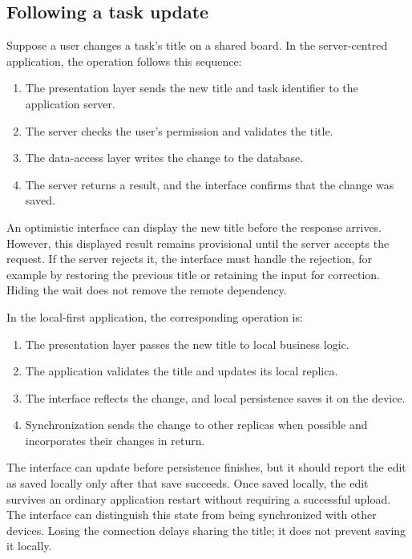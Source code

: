 \subsection{Following a task update}

Suppose a user changes a task's title on a shared board.
In the server-centred application, the operation follows this sequence:

\begin{enumerate}
	\item The presentation layer sends the new title and task identifier to the application server.
	\item The server checks the user's permission and validates the title.
	\item The data-access layer writes the change to the database.
	\item The server returns a result, and the interface confirms that the change was saved.
\end{enumerate}

An optimistic interface can display the new title before the response arrives.
However, this displayed result remains provisional until the server accepts the request.
If the server rejects it, the interface must handle the rejection, for example by restoring the previous title or retaining the input for correction.
Hiding the wait does not remove the remote dependency.
\parencite{local-first-software}

In the local-first application, the corresponding operation is:

\begin{enumerate}
	\item The presentation layer passes the new title to local business logic.
	\item The application validates the title and updates its local replica.
	\item The interface reflects the change, and local persistence saves it on the device.
	\item Synchronization sends the change to other replicas when possible and incorporates their changes in return.
\end{enumerate}

The interface can update before persistence finishes, but it should report the edit as saved locally only after that save succeeds.
Once saved locally, the edit survives an ordinary application restart without requiring a successful upload.
The interface can distinguish this state from being synchronized with other devices.
Losing the connection delays sharing the title; it does not prevent saving it locally.
\parencite{local-first-software}

